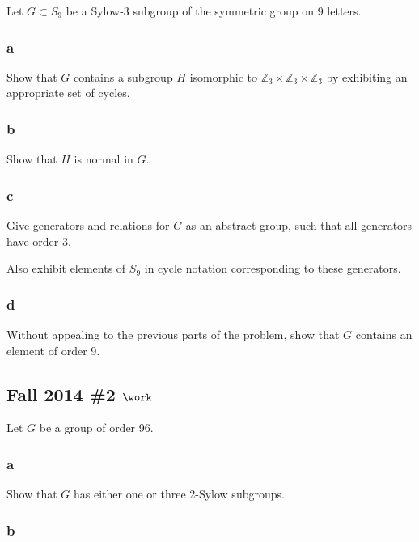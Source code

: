 Let \(G\subset S_9\) be a Sylow-3 subgroup of the symmetric group on 9
letters.

\hypertarget{a-4}{%
\subsubsection{a}\label{a-4}}

Show that \(G\) contains a subgroup \(H\) isomorphic to
\({\mathbb{Z}}_3 \times{\mathbb{Z}}_3 \times{\mathbb{Z}}_3\) by
exhibiting an appropriate set of cycles.

\hypertarget{b-4}{%
\subsubsection{b}\label{b-4}}

Show that \(H\) is normal in \(G\).

\hypertarget{c-3}{%
\subsubsection{c}\label{c-3}}

Give generators and relations for \(G\) as an abstract group, such that
all generators have order 3.

Also exhibit elements of \(S_9\) in cycle notation corresponding to
these generators.

\hypertarget{d-1}{%
\subsubsection{d}\label{d-1}}

Without appealing to the previous parts of the problem, show that \(G\)
contains an element of order 9.

\hypertarget{fall-2014-2-work}{%
\subsection{\texorpdfstring{Fall 2014 \#2
\(\work\)}{Fall 2014 \#2 \textbackslash work}}\label{fall-2014-2-work}}

Let \(G\) be a group of order 96.

\hypertarget{a-5}{%
\subsubsection{a}\label{a-5}}

Show that \(G\) has either one or three 2-Sylow subgroups.

\hypertarget{b-5}{%
\subsubsection{b}\label{b-5}}

